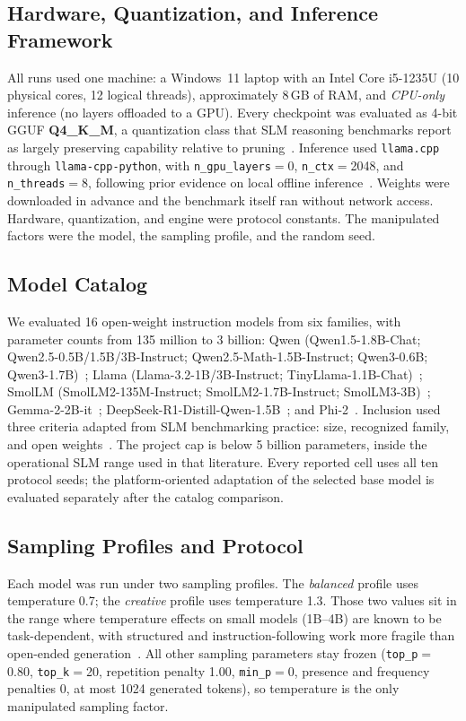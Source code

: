 \documentclass[fleqn,10pt]{JLA_article}
\begin{document}
\subsection{Hardware, Quantization, and Inference Framework}
All runs used one machine: a Windows~11 laptop with an Intel Core i5-1235U (10 physical cores, 12 logical threads), approximately 8\,GB of RAM, and \emph{CPU-only} inference (no layers offloaded to a GPU). Every checkpoint was evaluated as 4-bit GGUF \textbf{Q4\_K\_M}, a quantization class that SLM reasoning benchmarks report as largely preserving capability relative to pruning~\autocite{srivastava2025thinkslm}. Inference used \texttt{llama.cpp} through \texttt{llama-cpp-python}, with \texttt{n\_gpu\_layers}${}={}$0, \texttt{n\_ctx}${}={}$2048, and \texttt{n\_threads}${}={}$8, following prior evidence on local offline inference~\autocite{monteiro2025smalldevice}. Weights were downloaded in advance and the benchmark itself ran without network access. Hardware, quantization, and engine were protocol constants. The manipulated factors were the model, the sampling profile, and the random seed.

\subsection{Model Catalog}
We evaluated 16 open-weight instruction models from six families, with parameter counts from 135 million to 3 billion: Qwen (Qwen1.5-1.8B-Chat; Qwen2.5-0.5B/1.5B/3B-Instruct; Qwen2.5-Math-1.5B-Instruct; Qwen3-0.6B; Qwen3-1.7B)~\autocite{bai2023qwen,qwen2024qwen25,yang2024qwen25math,yang2025qwen3}; Llama (Llama-3.2-1B/3B-Instruct; TinyLlama-1.1B-Chat)~\autocite{grattafiori2024llama3,meta2024llama32,zhang2024tinyllama}; SmolLM (SmolLM2-135M-Instruct; SmolLM2-1.7B-Instruct; SmolLM3-3B)~\autocite{benallal2025smollm2,bakouch2025smollm3}; Gemma-2-2B-it~\autocite{gemmateam2024gemma2}; DeepSeek-R1-Distill-Qwen-1.5B~\autocite{deepseekai2025deepseekr1}; and Phi-2~\autocite{javaheripi2023phi2}. Inclusion used three criteria adapted from SLM benchmarking practice: size, recognized family, and open weights~\autocite{pham2025slmbench}. The project cap is below 5 billion parameters, inside the operational SLM range used in that literature. Every reported cell uses all ten protocol seeds; the platform-oriented adaptation of the selected base model is evaluated separately after the catalog comparison.

\subsection{Sampling Profiles and Protocol}
Each model was run under two sampling profiles. The \emph{balanced} profile uses temperature 0.7; the \emph{creative} profile uses temperature 1.3. Those two values sit in the range where temperature effects on small models (1B--4B) are known to be task-dependent, with structured and instruction-following work more fragile than open-ended generation~\autocite{li2025temperature}. All other sampling parameters stay frozen (\texttt{top\_p}${}={}$0.80, \texttt{top\_k}${}={}$20, repetition penalty 1.00, \texttt{min\_p}${}={}$0, presence and frequency penalties 0, at most 1024 generated tokens), so temperature is the only manipulated sampling factor.
\end{document}
